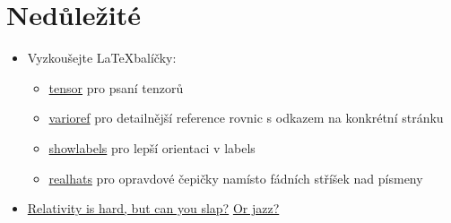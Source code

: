 \documentclass{article}
\begin{document}
\section*{Nedůležité}
\begin{itemize}
    \item Vyzkoušejte \LaTeX balíčky: 
    \begin{itemize}
        \item \href{https://www.ctan.org/pkg/tensor}{tensor} pro psaní tenzorů
        \item \href{https://www.ctan.org/pkg/varioref}{varioref} pro detailnější reference rovnic s odkazem na konkrétní stránku
        \item \href{https://www.ctan.org/pkg/showlabels}{showlabels} pro lepší orientaci v labels
        \item \href{https://ctan.org/pkg/realhats?lang=en}{realhats} pro opravdové čepičky namísto fádních stříšek nad písmeny
    \end{itemize}
    
    \item \href{https://www.youtube.com/watch?v=giPVUHYlW50}{Relativity is hard, but can you slap?} \href{https://www.youtube.com/watch?v=fwkvC2FT7Xs}{Or jazz?}
\end{itemize}
\end{document}
